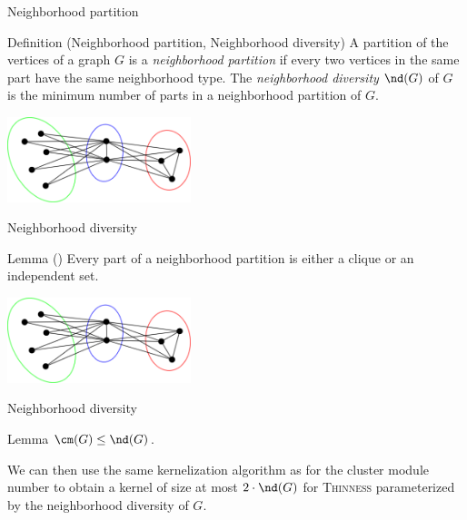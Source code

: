 \documentclass{beamer}
\begin{document}
\begin{frame}{Neighborhood partition}
    \begin{block}{Definition (Neighborhood partition, Neighborhood diversity)}
        A partition of the vertices of a graph $G$ is a \emph{neighborhood partition} if every two vertices in the same part have the same neighborhood type. The \emph{neighborhood diversity} $\nd(G)$ of $G$ is the minimum number of parts in a neighborhood partition of $G$.
    \end{block}
    \begin{center}
        \includegraphics[width=0.4\textwidth]{img/neighborhood_partition.png}
    \end{center}
\end{frame}

\begin{frame}{Neighborhood diversity}
    \begin{block}{Lemma (\cite{neighborhood-diversity})}
        Every part of a neighborhood partition is either a clique or an independent set.
    \end{block}

    \begin{center}
        \includegraphics[width=0.4\textwidth]{img/neighborhood_partition.png}
    \end{center}
\end{frame}

\begin{frame}{Neighborhood diversity}
    \begin{block}{Lemma}
        $\cm(G) \leq \nd(G)$.
    \end{block}
    \pause
    \vspace{1em}
    We can then use the same kernelization algorithm as for the cluster module number to obtain a kernel of size at most $2 \cdot \nd(G)$ for \textsc{Thinness} parameterized by the neighborhood diversity of $G$.
\end{frame}
\end{document}
